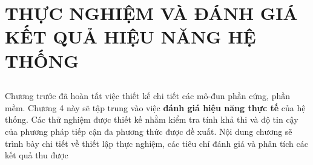 \chapter[KẾT QUẢ VÀ THỰC NGHIỆM]{THỰC NGHIỆM VÀ ĐÁNH GIÁ KẾT QUẢ HIỆU NĂNG HỆ THỐNG}
\label{chap:results} %

\section*{} %
Chương trước đã hoàn tất việc thiết kế chi tiết các mô-đun phần cứng, phần mềm. Chương 4 này sẽ tập trung vào việc \textbf{đánh giá hiệu năng thực tế} của hệ thống. Các thử nghiệm được thiết kế nhằm kiểm tra tính khả thi và độ tin cậy của phương pháp tiếp cận đa phương thức được đề xuất. Nội dung chương sẽ trình bày chi tiết về thiết lập thực nghiệm, các tiêu chí đánh giá và phân tích các kết quả thu được

